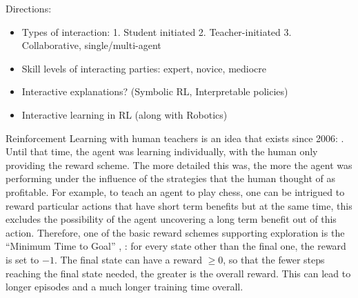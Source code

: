 Directions:
\begin{itemize}
   \item Types of interaction: 1. Student initiated 2. Teacher-initiated 3. Collaborative, single/multi-agent
   \item Skill levels of interacting parties: expert, novice, mediocre
   \item Interactive explanations? (Symbolic RL, Interpretable policies)
    \item Interactive learning in RL (along with Robotics)
\end{itemize}







Reinforcement Learning with human teachers is an idea that exists since 2006: \cite{Thomaz:2006:RLWithHumanTeachers}. Until that time, the agent was learning individually, with the human only providing the reward scheme. The more detailed this was, the more the agent was performing under the influence of the strategies that the human thought of as profitable. For example, to teach an agent to play chess, one can be intrigued to reward particular actions that have short term benefits but at the same time, this excludes the possibility of the agent uncovering a long term benefit out of this action. Therefore, one of the basic reward schemes supporting exploration is the ``Minimum Time to Goal'' \cite{Harmon:1997:ReinforcementLearningATutorial}, \cite{SuttonBarto:2018:RLIntroduction}: for every state other than the final one, the reward is set to $-1$. The final state can have a reward $\geq 0$, 
so that the fewer steps reaching the final state needed, the greater is the overall reward. This can lead to longer episodes and a much longer training time overall.  


